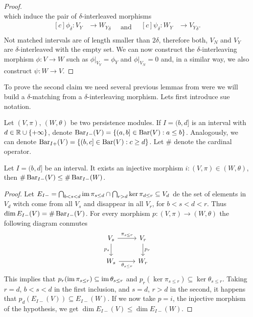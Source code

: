 \begin{proof}
\begin{equation*}
    \end{equation*}
    which induce the pair of $\delta$-interleaved morphisms
    \begin{equation*}
        \begin{aligned}[c]
        \phi_\delta: V_Y &\to {W_Y}_\delta\\
        \end{aligned}
        \quad \text{and} \quad
        \begin{aligned}[c]
        \psi_\delta: W_Y &\to {V_Y}_\delta.\\
        \end{aligned}
    \end{equation*}
    Not matched intervals are of length smaller than $ 2 \delta $, therefore both, $V_N$ and $V_Y$ are $\delta$-interleaved with the empty set. We can now construct the $\delta$-interleaving morphism $ \phi: V \to W$ such as $\phi \vert_{V_Y} = \phi_Y$ and $\phi \vert_{V_N} = 0$ and, in a similar way, we also construct $ \psi: W \to V$.
\end{proof}

To prove the second claim we need several previous lemmas from were we will build a $\delta$-matching from a $\delta$-interleaving morphism. Lets first introduce sue notation.

Let $(V, \pi)$, $(W, \theta)$ be two persistence modules. If $ I = (b, d]$ is an interval with $ d \in \mathbb R \cup \{+ \infty\}$, denote $ \operatorname{Bar}_{I-}(V) = \left\{ (a, b] \in \operatorname{Bar}(V) : a \leq b\right\}$. Analogously, we can denote $ \operatorname{Bar}_{I+}(V) = \left\{ (b, c] \in \operatorname{Bar}(V) : c \geq d\right\}$. Let $ \# $ denote the cardinal operator.

\begin{lemma} \label{lemma:inj-cardinalities} %
    Let $ I = (b, d] $ be an interval. It exists an injective morphism $i: (V, \pi) \in (W, \theta) $, then $\# \operatorname{Bar}_{I-}(V) \leq \# \operatorname{Bar}_{I-}(W) $.
\end{lemma}
\begin{proof}
    Let $ E_{I-} = \bigcap_{b < s < d} \operatorname{im} \pi_{s\leq d} \cap \bigcap_{r> d} \ker \pi_{d \leq r} \subseteq V_d $ de the set of elements in $ V_d $ witch come from all $ V_s $ and disappear in all $ V_r $, for $ b < s < d < r $. Thus $ \dim E_{I-}(V) = \# \operatorname{Bar}_{I-}(V) $. For every morphism $ p: (V, \pi) \to (W, \theta) $ the following diagram conmutes
    $$
    \begin{tikzcd}
        V_s \arrow[r, "\pi_{s \leq r}"] \arrow[d, "p_s"'] & V_r \arrow[d, "p_r"] \\
        W_s \arrow[r, "\theta_{s \leq r}"']               & W_r
    \end{tikzcd}
    $$
    This implies that $ p_r(\operatorname{im} \pi_{s \leq r}) \subseteq \operatorname{im} \theta_{s \leq r} $ and $ p_r(\ker \pi_{s \leq r}) \subseteq \ker \theta_{s \leq r} $. Taking $ r = d $, $ b < s < d $ in the first inclusion, and $ s = d $, $ r > d $ in the second, it happens that $ p_d(E_{I-}(V)) \subseteq E_{I-}(W) $. If we now take $ p = i $, the injective morphism of the hypothesis, we get $ \dim E_{I-}(V) \leq \dim E_{I-}(W)$.
\end{proof}
 

